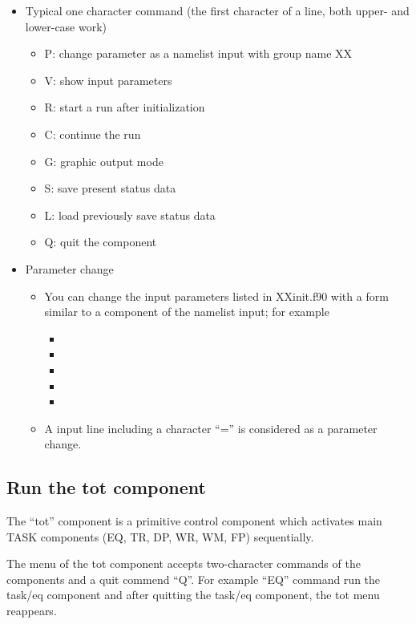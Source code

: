 \documentclass[11pt]{article}
\begin{document}
\begin{itemize}
\item
Typical one character command (the first character of a line, both
upper- and lower-case work)
\begin{itemize}
\item[]
P: change parameter as a namelist input with group name XX
\item[]
V: show input parameters
\item[]
R: start a run after initialization
\item[]
C: continue the run
\item[]
G: graphic output mode
\item[]
S: save present status data
\item[]
L: load previously save status data
\item[]
Q: quit the component
\end{itemize}
\item
Parameter change
\begin{itemize}
\item
You can change the input parameters listed in XXinit.f90 with a form
similar to a component of the namelist input; for example
\begin{itemize}
\item[]
\item[]
\item[]
\item[]
\item[]
\end{itemize}

\item
A input line including a character ``='' is considered as a parameter change.
\end{itemize}
\end{itemize}

\subsection{Run the tot component}

The ``tot'' component is a primitive control component which activates
main TASK components (EQ, TR, DP, WR, WM, FP) sequentially.  

The menu of the tot component accepts two-character commands of the
components and a quit commend ``Q''.  For example ``EQ'' command run
the task/eq component and after quitting the task/eq component, the tot
menu reappears.  
\end{document}
